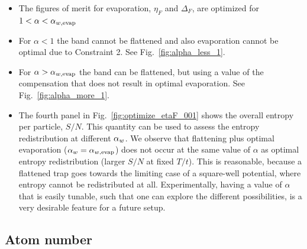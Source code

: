 \begin{itemize}

\item The figures of merit for evaporation, $\eta_{F}$ and $\Delta_{F}$, are optimized for $ 1 < \alpha <  \alpha_{w,\text{evap}} $ 

\item For $\alpha < 1$ the band cannot be flattened and also evaporation cannot
be optimal due to Constraint 2.  See Fig.~\ref{fig:alpha_less_1}. 

\item For $\alpha >  \alpha_{w,\text{evap}} $ the band can be flattened, but using a value
of the compensation that does not result in optimal evaporation. See
Fig.~\ref{fig:alpha_more_1}. 

\item The fourth panel in Fig.~\ref{fig:optimize_etaF_001} shows the overall
entropy per particle, $S/N$.  This quantity can be used to assess the entropy
redistribution at different $ \alpha_{w} $.   We observe that flattening plus
optimal evaporation ($ \alpha_{w}  =  \alpha_{w,\text{evap}} $) does not occur at the same value
of $\alpha$ as optimal entropy redistribution (larger $S/N$ at fixed $T/t$).
This is reasonable, because a flattened trap goes towards the limiting case of
a square-well potential, where entropy cannot be redistributed at all.
Experimentally, having a value of $\alpha$ that is easily tunable, such that
one can explore the different possibilities,  is a very desirable feature for a
future setup. 

\end{itemize} 

\subsection{Atom number} 


